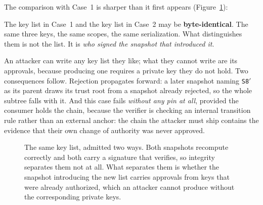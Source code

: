 \documentclass[11pt,a4paper]{article}
\begin{document}
The comparison with Case~1 is sharper than it first appears
(Figure~\ref{fig:cases}):

\begin{callout}
The key list in Case~1 and the key list in Case~2 may be \textbf{byte-identical}.
The same three keys, the same scopes, the same serialization. What distinguishes
them is not the list. It is \emph{who signed the snapshot that introduced it}.
\end{callout}

An attacker can write any key list they like; what they cannot write are its
approvals, because producing one requires a private key they do not hold. Two
consequences follow. Rejection propagates forward: a later snapshot naming
\texttt{S8$'$} as its parent draws its trust root from a snapshot already
rejected, so the whole subtree falls with it. And this case fails
\emph{without any pin at all}, provided the consumer holds the chain, because
the verifier is checking an internal transition rule rather than an external
anchor: the chain the attacker must ship contains the evidence that their own
change of authority was never approved.

\begin{figure}[t]
\centering
{}
\caption{The same key list, admitted two ways. Both snapshots recompute
correctly and both carry a signature that verifies, so integrity separates them
not at all. What separates them is whether the snapshot introducing the new list
carries approvals from keys that were already authorized, which an attacker
cannot produce without the corresponding private keys.}
\label{fig:cases}
\end{figure}
\end{document}
